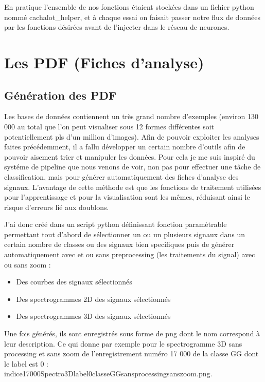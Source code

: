En pratique l'ensemble de nos fonctions étaient stockées dans un fichier python nommé cachalot\_helper, et à chaque essai on faisait passer notre flux de données par les fonctions désirées avant de l'injecter dans le réseau de neurones.


\hypertarget{Les-PDF}{%
\section{Les PDF (Fiches d'analyse)}
\label{Les-PDF}}

\hypertarget{Guxe9nuxe9ration-des-PDF}{%
\subsection{Génération des PDF}
\label{Guxe9nuxe9ration-des-PDF}}

Les bases de données contiennent un très grand nombre d'exemples (environ 130 000 au total que l'on peut visualiser sous 12 formes différentes soit potentiellement pls d'un million d'images).
Afin de pouvoir exploiter les analyses faites précédemment,  il a fallu développer un certain nombre d'outils afin de pouvoir aisement trier et manipuler les données.
Pour cela je me suis inspiré du systéme de pipeline que nous venons de voir, non pas pour 
effectuer une tâche de classification, mais pour générer automatiquement des fiches d'analyse 
des signaux.
L'avantage de cette méthode est que les fonctions de traitement utilisées pour l'apprentissage et pour la visualisation sont les mêmes, réduisant ainsi le risque d'erreurs lié aux doublons.

J'ai donc créé dans un script python définissant fonction paramètrable permettant tout d'abord de sélectionner un ou un plusieurs signaux dans un certain nombre de classes ou des signaux bien specifiques puis de générer automatiquement avec et ou sans preprocessing (les traitements du signal) avec ou sans zoom :
\begin{itemize}
\item Des courbes des signaux sélectionnés
\item Des spectrogrammes 2D des signaux sélectionnés
\item Des spectrogrammes 3D des signaux sélectionnés
\end{itemize}
Une fois générés, ils sont enregistrés sous forme de png dont le nom correspond à leur description. Ce qui donne par exemple pour le spectrogramme 3D sans processing et sans zoom de l'enregistrement numéro 17 000 de la classe GG dont le label est 0 :\\
indice17000Spectro3Dlabel0classeGGsansprocessingsanszoom.png. 

